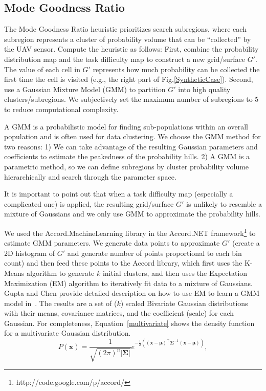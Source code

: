 \documentclass[journal]{IEEEtran}
\begin{document}
\subsection{Mode Goodness Ratio}

The Mode Goodness Ratio heuristic prioritizes search subregions, where each subregion represents a cluster of probability volume that can be ``collected'' by the UAV sensor. Compute the heuristic as follows: First, combine the probability distribution map and the task difficulty map to construct a new grid/surface $G'$. The value of each cell in $G'$ represents how much probability can be collected the first time the cell is visited (e.g., the right part of Fig.\ref{SyntheticCase}). Second, use a Gaussian Mixture Model (GMM) to partition $G'$ into high quality clusters/subregions. We subjectively set the maximum number of subregions to 5 to reduce computational complexity.

A GMM is a probabilistic model for finding sub-populations within an overall population and is often used for data clustering. We choose the GMM method for two reasons: 1) We can take advantage of the resulting Gaussian parameters and coefficients to estimate the peakedness of the probability hills. 2) A GMM is a parametric method, so we can define subregions by cluster probability volume hierarchically and search through the parameter space.

It is important to point out that when a task difficulty map (especially a complicated one) is applied, the resulting grid/surface $G'$ is unlikely to resemble a mixture of Gaussians and we only use GMM to approximate the probability hills.

We used the Accord.MachineLearning library in the Accord.NET framework\footnote{http://code.google.com/p/accord/} to estimate GMM parameters. We generate data points to approximate $G'$ (create a 2D histogram of $G'$ and generate number of points proportional to each bin count) and then feed these points to the Accord library, which first uses the K-Means algorithm to generate $k$ initial clusters, and then uses the Expectation Maximization (EM) algorithm to iteratively fit data to a mixture of Gaussians. Gupta and Chen provide detailed description on how to use EM to learn a GMM model in~\cite{gupta2011theory}. The results are a set of ($k$) scaled Bivariate Gaussian distributions with their means, covariance matrices, and the coefficient (scale) for each Gaussian. For completeness, Equation~\ref{multivariate} shows the density function for a multivariate Gaussian distribution.
\begin{equation}
P(\mathbf{x}) = \frac{1}{\sqrt{(2\pi)^n|\mathbf{\Sigma}|}} e^{-\frac{1}{2}\left( (\mathbf{x}-\mathbf{\mu})^{\top}\mathbf{\Sigma}^{-1} (\mathbf{x}-\mathbf{\mu}) \right)} ,
\label{multivariate}
\end{equation}
\end{document}
